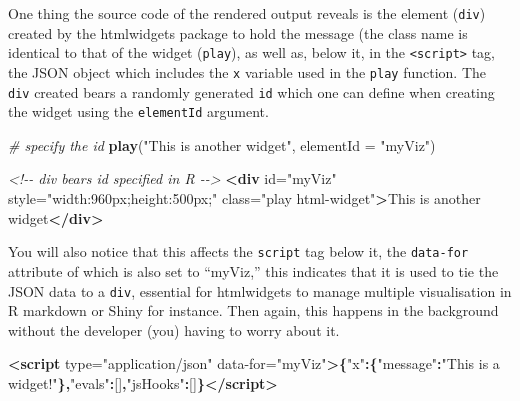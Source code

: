\documentclass[
]{krantz}
\makeatletter
\newenvironment{Shaded}{\begin{snugshade}}{\end{snugshade}}
\newcommand{\CommentTok}[1]{\textcolor[rgb]{0.37,0.37,0.37}{\textit{#1}}}
\newcommand{\DataTypeTok}[1]{\textcolor[rgb]{0.27,0.27,0.27}{#1}}
\newcommand{\KeywordTok}[1]{\textcolor[rgb]{0.27,0.27,0.27}{\textbf{#1}}}
\newcommand{\NormalTok}[1]{#1}
\newcommand{\OperatorTok}[1]{\textcolor[rgb]{0.43,0.43,0.43}{\textbf{#1}}}
\newcommand{\OtherTok}[1]{\textcolor[rgb]{0.37,0.37,0.37}{#1}}
\newcommand{\StringTok}[1]{\textcolor[rgb]{0.5,0.5,0.5}{#1}}
\newenvironment{kframe}{%
\medskip{}
\setlength{\fboxsep}{.8em}
 \def\at@end@of@kframe{}%
 \ifinner\ifhmode%
  \def\at@end@of@kframe{\end{minipage}}%
  \begin{minipage}{\columnwidth}%
 \fi\fi%
 \def\FrameCommand##1{\hskip\@totalleftmargin \hskip-\fboxsep
 \colorbox{shadecolor}{##1}\hskip-\fboxsep
     \hskip-\linewidth \hskip-\@totalleftmargin \hskip\columnwidth}%
 \MakeFramed {\advance\hsize-\width
   \@totalleftmargin\z@ \linewidth\hsize
   \@setminipage}}%
 {\par\unskip\endMakeFramed%
 \at@end@of@kframe}
\renewenvironment{Shaded}{\begin{kframe}}{\end{kframe}}
\makeatother
\begin{document}
One thing the source code of the rendered output reveals is the element (\texttt{div}) created by the htmlwidgets package to hold the message (the class name is identical to that of the widget (\texttt{play}), as well as, below it, in the \texttt{\textless{}script\textgreater{}} tag, the JSON object which includes the \texttt{x} variable used in the \texttt{play} function. The \texttt{div} created bears a randomly generated \texttt{id} which one can define when creating the widget using the \texttt{elementId} argument.

\begin{Shaded}
\begin{Highlighting}[]
\CommentTok{\# specify the id}
\KeywordTok{play}\NormalTok{(}\StringTok{"This is another widget"}\NormalTok{, }\DataTypeTok{elementId =} \StringTok{"myViz"}\NormalTok{)}
\end{Highlighting}
\end{Shaded}

\begin{Shaded}
\begin{Highlighting}[]
\CommentTok{<!{-}{-} div bears id specified in R {-}{-}>}
\KeywordTok{<div}\OtherTok{ id=}\StringTok{"myViz"}\OtherTok{ style=}\StringTok{"width:960px;height:500px;"}\OtherTok{ class=}\StringTok{"play html{-}widget"}\KeywordTok{>}\NormalTok{This is another widget}\KeywordTok{</div>}
\end{Highlighting}
\end{Shaded}

You will also notice that this affects the \texttt{script} tag below it, the \texttt{data-for} attribute of which is also set to ``myViz,'' this indicates that it is used to tie the JSON data to a \texttt{div}, essential for htmlwidgets to manage multiple visualisation in R markdown or Shiny for instance. Then again, this happens in the background without the developer (you) having to worry about it.

\begin{Shaded}
\begin{Highlighting}[]
\KeywordTok{<script}\OtherTok{ type=}\StringTok{"application/json"}\OtherTok{ data{-}for=}\StringTok{"myViz"}\KeywordTok{>}\OperatorTok{\{}\StringTok{"x"}\OperatorTok{:\{}\StringTok{"message"}\OperatorTok{:}\StringTok{"This is a widget!"}\OperatorTok{\},}\StringTok{"evals"}\OperatorTok{:}\NormalTok{[]}\OperatorTok{,}\StringTok{"jsHooks"}\OperatorTok{:}\NormalTok{[]}\OperatorTok{\}}\KeywordTok{</script>}
\end{Highlighting}
\end{Shaded}
\end{document}
